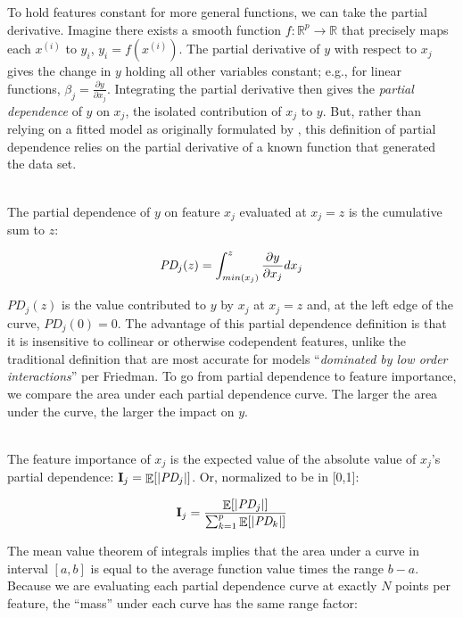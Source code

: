 \documentclass[12pt]{article}
\newcommand{\todo}[1]{{{\color{red}{[#1]}}}}
\newcommand{\Ex}{\mathop{\mathbb{E}}}
\newcommand{\Imp}{\mathbf{I}}
\renewcommand{\xi}{x^{(i)}}
\begin{document}
To hold features constant for more general functions, we can take the partial derivative. Imagine there exists a smooth function $f:\mathbb{R}^{p} \rightarrow \mathbb{R}$ that precisely maps each $\xi$ to $y_i$, ${y_i} = f(\xi)$. \todo{should that be $y^{(i)}$ to be consistent?} The partial derivative of $y$ with respect to $x_j$ gives the change in $y$ holding all other variables constant; e.g., for linear functions, $\beta_j = \frac{\partial y}{\partial x_j}$. Integrating the partial derivative then gives the {\em partial dependence}  of $y$ on $x_j$, the isolated contribution of $x_j$ to $y$. But, rather than relying on a fitted model as originally formulated by \cite{PDP}, this definition of partial dependence relies on the partial derivative of a known function that generated the data set.

~\\
 The partial dependence of $y$ on feature $x_j$ evaluated at $x_j = z$ is the cumulative sum to $z$:

\begin{equation}\label{eq:pd}
\text{\it PD}_j(z) = \int_{min(x_j)}^z \frac{\partial y}{\partial x_j} dx_j
\end{equation}

$PD_j(z)$ is the value contributed to $y$ by $x_j$ at $x_j = z$ and, at the left edge of the curve, $PD_j(0)=0$. The advantage of this partial dependence definition is that it is insensitive to collinear or otherwise codependent features, unlike the traditional definition that are most accurate for models ``{\em dominated by low order interactions}'' per Friedman.  To go from partial dependence to feature importance, we compare the area under each partial dependence curve. The larger the area under the curve, the larger the impact on $y$.

~\\
 The feature importance of $x_j$ is the expected value of the absolute value of $x_j$'s partial dependence: $\Imp_j = \Ex[|\text{\it PD}_j|]$. Or, normalized to be in [0,1]:

\begin{equation}\label{eq:Epd2}
\Imp_j = \frac{\Ex[|\text{\it PD}_j|]}{\sum_{k=1}^p \Ex[|\text{\it PD}_k|]}
\end{equation}

The mean value theorem of integrals implies that the area under a curve in interval $[a,b]$ is equal to the average function value times the range $b-a$.  Because we are evaluating each partial dependence curve at exactly $N$ points per feature, the ``mass'' under each curve has the same range factor:
\end{document}

